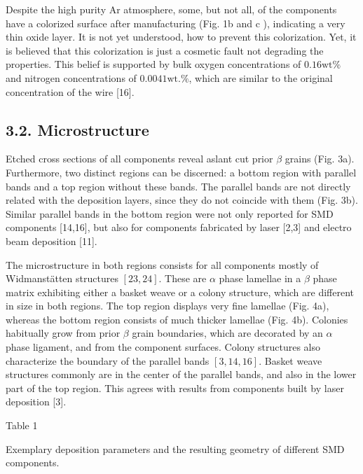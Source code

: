 \documentclass[10pt]{article}
\begin{document}
Despite the high purity Ar atmosphere, some, but not all, of the components have a colorized surface after manufacturing (Fig. 1b and $\mathrm{c}$ ), indicating a very thin oxide layer. It is not yet understood, how to prevent this colorization. Yet, it is believed that this colorization is just a cosmetic fault not degrading the properties. This belief is supported by bulk oxygen concentrations of $0.16 \mathrm{wt} \%$ and nitrogen concentrations of $0.0041 \mathrm{wt} . \%$, which are similar to the original concentration of the wire [16].

\subsection*{3.2. Microstructure}
Etched cross sections of all components reveal aslant cut prior $\beta$ grains (Fig. 3a). Furthermore, two distinct regions can be discerned: a bottom region with parallel bands and a top region without these bands. The parallel bands are not directly related with the deposition layers, since they do not coincide with them (Fig. 3b). Similar parallel bands in the bottom region were not only reported for SMD components [14,16], but also for components fabricated by laser [2,3] and electro beam deposition [11].

The microstructure in both regions consists for all components mostly of Widmanstätten structures $[23,24]$. These are $\alpha$ phase lamellae in a $\beta$ phase matrix exhibiting either a basket weave or a colony structure, which are different in size in both regions. The top region displays very fine lamellae (Fig. 4a), whereas the bottom region consists of much thicker lamellae (Fig. 4b). Colonies habitually grow from prior $\beta$ grain boundaries, which are decorated by an $\alpha$ phase ligament, and from the component surfaces. Colony structures also characterize the boundary of the parallel bands $[3,14,16]$. Basket weave structures commonly are in the center of the parallel bands, and also in the lower part of the top region. This agrees with results from components built by laser deposition [3].

Table 1

Exemplary deposition parameters and the resulting geometry of different SMD components.
\end{document}
